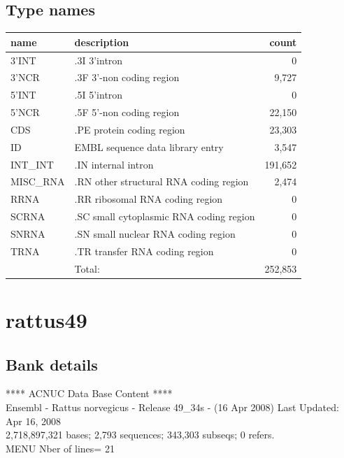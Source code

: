 \documentclass{article}
\begin{document}
\begin{Schunk}
\subsection{Type names}
\noindent\begin{tabular}{llr}
\hline \hline
name & description & count \\
\hline
3'INT  &  .3I 3'intron  &  0 \\
3'NCR  &  .3F  3'-non coding region  &  9,727 \\
5'INT  &  .5I 5'intron  &  0 \\
5'NCR  &  .5F  5'-non coding region  &  22,150 \\
CDS  &  .PE protein coding region  &  23,303 \\
ID  &  EMBL sequence data library entry  &  3,547 \\
INT\_INT  &  .IN  internal intron  &  191,652 \\
MISC\_RNA  &  .RN other structural RNA coding region  &  2,474 \\
RRNA  &  .RR ribosomal RNA coding region  &  0 \\
SCRNA  &  .SC small cytoplasmic RNA coding region  &  0 \\
SNRNA  &  .SN small nuclear RNA coding region  &  0 \\
TRNA  &  .TR transfer RNA coding region  &  0 \\
\hline
 & Total: & 252,853 \\
\hline \hline
\end{tabular}

\section{ rattus49 }
\subsection{Bank details}
             ****     ACNUC Data Base Content      ****                         \\
Ensembl - Rattus norvegicus - Release 49\_34s - (16 Apr 2008) Last Updated: Apr 16, 2008\\
2,718,897,321 bases; 2,793 sequences; 343,303 subseqs; 0 refers.\\
MENU Nber of lines= 21                                                         


\end{Schunk}
\end{document}
